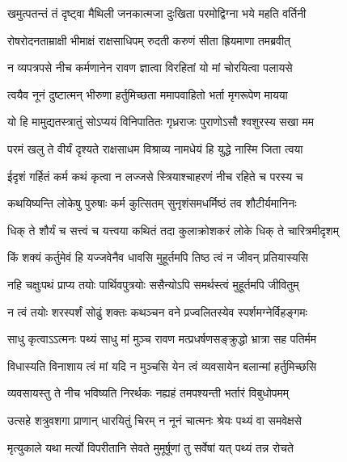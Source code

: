 
\twolineshloka
{खमुत्पतन्तं तं दृष्ट्वा मैथिली जनकात्मजा}
{दुःखिता परमोद्विग्ना भये महति वर्तिनी} %

\twolineshloka
{रोषरोदनताम्राक्षी भीमाक्षं राक्षसाधिपम्}
{रुदती करुणं सीता ह्रियमाणा तमब्रवीत्} %

\twolineshloka
{न व्यपत्रपसे नीच कर्मणानेन रावण}
{ज्ञात्वा विरहितां यो मां चोरयित्वा पलायसे} %

\twolineshloka
{त्वयैव नूनं दुष्टात्मन् भीरुणा हर्तुमिच्छता}
{ममापवाहितो भर्ता मृगरूपेण मायया} %

\twolineshloka
{यो हि मामुद्यतस्त्रातुं सोऽप्ययं विनिपातितः}
{गृध्रराजः पुराणोऽसौ श्वशुरस्य सखा मम} %

\twolineshloka
{परमं खलु ते वीर्यं दृश्यते राक्षसाधम}
{विश्राव्य नामधेयं हि युद्धे नास्मि जिता त्वया} %

\twolineshloka
{ईदृशं गर्हितं कर्म कथं कृत्वा न लज्जसे}
{स्त्रियाश्चाहरणं नीच रहिते च परस्य च} %

\twolineshloka
{कथयिष्यन्ति लोकेषु पुरुषाः कर्म कुत्सितम्}
{सुनृशंसमधर्मिष्ठं तव शौटीर्यमानिनः} %

\twolineshloka
{धिक् ते शौर्यं च सत्त्वं च यत्त्वया कथितं तदा}
{कुलाक्रोशकरं लोके धिक् ते चारित्रमीदृशम्} %

\twolineshloka
{किं शक्यं कर्तुमेवं हि यज्जवेनैव धावसि}
{मुहूर्तमपि तिष्ठ त्वं न जीवन् प्रतियास्यसि} %

\twolineshloka
{नहि चक्षुःपथं प्राप्य तयोः पार्थिवपुत्रयोः}
{ससैन्योऽपि समर्थस्त्वं मुहूर्तमपि जीवितुम्} %

\twolineshloka
{न त्वं तयोः शरस्पर्शं सोढुं शक्तः कथञ्चन}
{वने प्रज्वलितस्येव स्पर्शमग्नेर्विहङ्गमः} %

\twolineshloka
{साधु कृत्वाऽऽत्मनः पथ्यं साधु मां मुञ्च रावण}
{मत्प्रधर्षणसङ्क्रुद्धो भ्रात्रा सह पतिर्मम} %

\twolineshloka
{विधास्यति विनाशाय त्वं मां यदि न मुञ्चसि}
{येन त्वं व्यवसायेन बलान्मां हर्तुमिच्छसि} %

\twolineshloka
{व्यवसायस्तु ते नीच भविष्यति निरर्थकः}
{नह्यहं तमपश्यन्ती भर्तारं विबुधोपमम्} %

\twolineshloka
{उत्सहे शत्रुवशगा प्राणान् धारयितुं चिरम्}
{न नूनं चात्मनः श्रेयः पथ्यं वा समवेक्षसे} %

\twolineshloka
{मृत्युकाले यथा मर्त्यो विपरीतानि सेवते}
{मुमूर्षूणां तु सर्वेषां यत् पथ्यं तन्न रोचते} %

